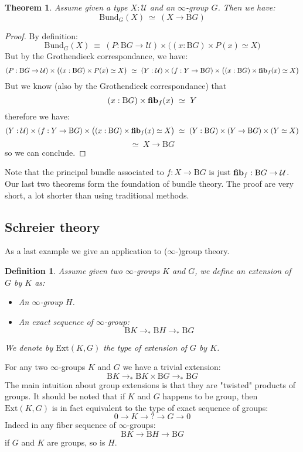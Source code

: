 \documentclass{article}
\newcommand{\sse}[1]{\medbreak \subsection{#1}}
\newcommand{\U}{{\mathcal U}}
\renewcommand{\r}{\rightarrow}
\newcommand{\fib}{\mathrm{\bf fib}}
\newcommand{\B}{\mathrm{B}}
\newtheorem{definition}{Definition}
\newtheorem{theorem}{Theorem}
\begin{document}
\begin{theorem}
Assume given a type $X:\U$ and an $\infty$-group $G$. Then we have:
\[\mathrm{Bund}_G(X)\ \simeq\ (X\r \B G)\]
\end{theorem}
\begin{proof}
By definition:
\[\mathrm{Bund}_G(X)\ \equiv\ (P : \B G \r \U)\times \big((x:\B G)\times P(x) \simeq X \big)\]
But by the Grothendieck correspondance, we have:
 \[(P : \B G \r \U)\times \big((x:\B G)\times P(x) \simeq X \big) \ \simeq\ (Y:\U)\times (f:Y\r \B G) \times \big((x:\B G)\times \fib_f(x) \simeq X\big)\]
 But we know (also by the Grothendieck correspondance) that  
 \[(x:\B G)\times \fib_f(x)\ \simeq\ Y\]
 therefore we have:
 \[(Y:\U)\times (f:Y\r \B G) \times \big((x:\B G)\times \fib_f(x) \simeq X\big) \ \simeq \ (Y:\B G)\times  (Y\r \B G)\times (Y \simeq X)\]
\[\simeq \ X\r \B G\]
 so we can conclude.
\end{proof}

Note that the principal bundle associated to $f:X\r \B G$ is just $\fib_f : \B G \r \U$. Our last two theorems form the foundation of bundle theory. The proof are very short, a lot shorter than using traditional methods. 


\sse{Schreier theory}

As a last example we give an application to ($\infty$-)group theory.

\begin{definition}
Assume given two $\infty$-groups $K$ and $G$, we define an extension of $G$ by $K$ as:
\begin{itemize}
\item An $\infty$-group $H$.
\item An exact sequence of $\infty$-group:
\[\B K \r_* \B H\r_* \B G\]
\end{itemize}
We denote by $\mathrm{Ext}(K,G)$ the type of extension of $G$ by $K$.
\end{definition}

For any two $\infty$-groups $K$ and $G$ we have a trivial extension:
\[\B K\r_* \B K\times\B G\r_*\B G\]
The main intuition about group extensions is that they are "twisted" products of groups. %
It should be noted that if $K$ and $G$ happens to be group, then $\mathrm{Ext}(K,G)$ is in fact equivalent to the type of exact sequence of groups:
\[0\r K\r ?\r G\r 0\]
Indeed in any fiber sequence of $\infty$-groups:
\[\B K \r \B H\r \B G\]
if $G$ and $K$ are groups, so is $H$.
\end{document}

